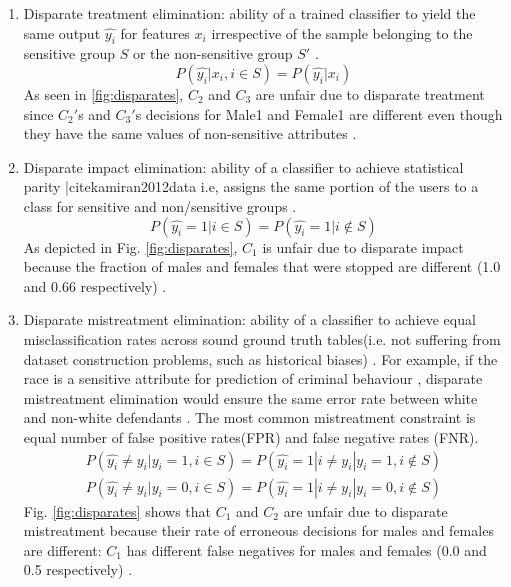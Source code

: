 \documentclass[runningheads]{llncs}
\begin{document}
\begin{enumerate}
\item Disparate treatment elimination: ability of a trained classifier to yield the same output $\hat{y_i}$ for features $x_i$ irrespective of the sample belonging to the sensitive group $S$ or the non-sensitive group $S'$ \cite{krasanakis2018adaptive}.
\begin{equation}
P(\hat{y_i}|x_i, i \in S) = P(\hat{y_i}|x_i)
\label{eq:disparatetreatment}
\end{equation}
As seen in \ref{fig:disparates}, $C_2$ and $C_3$ are unfair due to disparate treatment since $C_2'$s and $C_3'$s decisions for Male1 and Female1 are different even though they have the same values of non-sensitive attributes \cite{zafar2017fairness}.
\item Disparate impact elimination: ability of a classifier to achieve statistical parity |cite{kamiran2012data} \cite{kamiran2010discrimination} \cite{kamishima2012fairness} i.e, assigns the same portion of the users to a class for sensitive and non/sensitive groups \cite{krasanakis2018adaptive}.
\begin{equation}
P(\hat{y_i} = 1|i \in S) = P(\hat{y_i} = 1|i \notin S)
\label{eq:disparateimpact}
\end{equation}
As depicted in Fig. \ref{fig:disparates}, $C_1$ is unfair due to disparate impact because the fraction of males and females that were stopped are different (1.0 and 0.66 respectively) \cite{zafar2017fairness}.
\item Disparate mistreatment elimination: ability of a classifier to achieve equal misclassification rates across sound ground truth tables(i.e. not suffering from dataset construction problems, such as historical biases) \cite{zafar2015fairness} \cite{zafar2017fairness} \cite{krasanakis2018adaptive}. For example, if the race is a sensitive attribute for prediction of criminal behaviour \cite{compasdataset}, disparate mistreatment elimination would ensure the same error rate between white and non-white defendants \cite{krasanakis2018adaptive}. The most common mistreatment constraint is equal number of false positive rates(FPR) and false negative rates (FNR).
\begin{equation}
\begin{split}
P(\hat{y_i} \neq y_i | y_i = 1,i \in S) = P(\hat{y_i} = 1|i \neq y_i | y_i = 1,i \notin S) \\
P(\hat{y_i} \neq y_i | y_i = 0,i \in S) = P(\hat{y_i} = 1|i \neq y_i | y_i = 0,i \notin S)
\label{eq:disparatemis}
\end{split}
\end{equation}
Fig. \ref{fig:disparates} shows that $C_1$ and $C_2$ are unfair due to disparate mistreatment because their rate of erroneous decisions for males and females are different: $C_1$ has different false negatives for males and females (0.0 and 0.5 respectively) \cite{zafar2017fairness}.
\end{enumerate}
\end{document}
